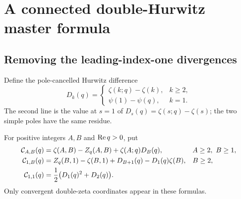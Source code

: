 \section{A connected double-Hurwitz master formula}\label{bmh:sec:master}

\subsection{Removing the leading-index-one divergences}
Define the pole-cancelled Hurwitz difference
\begin{equation}\label{bmh:eq:D}
 D_k(q)=\begin{cases}
 \zeta(k;q)-\zeta(k),&k\ge2,\\
 \psi(1)-\psi(q),&k=1.
 \end{cases}
\end{equation}
The second line is the value at $s=1$ of
$D_s(q)=\zeta(s;q)-\zeta(s)$; the two simple poles have the same residue.

\begin{definition}\label{bmh:def:connected}
For positive integers $A,B$ and $\operatorname{Re} q>0$, put
\begin{align}
 \mathcal C_{A,B}(q)
 &=\zeta(A,B)-Z_q(A,B)+\zeta(A;q)D_B(q),
 && A\ge2,\ B\ge1,\label{bmh:eq:Cbulk}\\
 \mathcal C_{1,B}(q)
 &=Z_q(B,1)-\zeta(B,1)+D_{B+1}(q)-D_1(q)\zeta(B),
 && B\ge2,\label{bmh:eq:Cedge}\\
 \mathcal C_{1,1}(q)&=\frac12\bigl(D_1(q)^2+D_2(q)\bigr).
 \label{bmh:eq:Ccorner}
\end{align}
Only convergent double-zeta coordinates appear in these formulas.
\end{definition}

